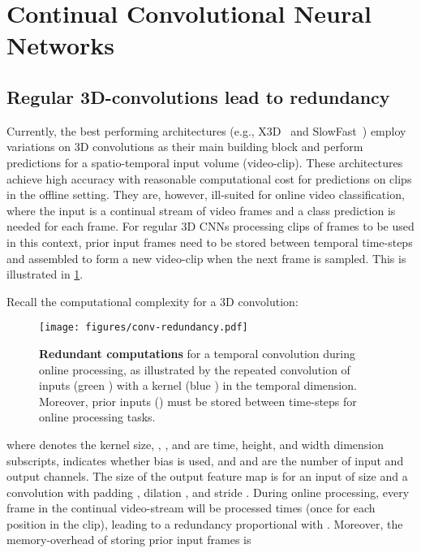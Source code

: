\documentclass[runningheads]{llncs}
\begin{document}
 \vspace{-2mm}
\section{Continual Convolutional Neural Networks}\label{sec:continual}
\vspace{-2mm}
\subsection{Regular 3D-convolutions lead to redundancy}\label{sec:regular-cnn-redundancy}
\vspace{-1mm}
Currently, the best performing architectures (e.g., X3D~\cite{feichtenhofer2020x3d} and SlowFast~\cite{feichtenhofer2019slowfast}) employ variations on 3D convolutions as their main building block and perform predictions for a spatio-temporal input volume (video-clip). 
These architectures achieve high accuracy with reasonable computational cost for predictions on clips in the offline setting.
They are, however, ill-suited for online video classification, 
where the input is a continual stream of video frames and a class prediction is needed for each frame. 
For regular 3D CNNs processing clips of  frames to be used in this context, prior  input frames need to be stored between temporal time-steps and assembled to form a new video-clip when the next frame is sampled.
This is illustrated in \cref{fig:conv-redundancy}.

Recall the computational complexity for a 3D convolution:

\begin{figure}
    \centering
    \texttt{[image: figures/conv-redundancy.pdf]}
	\caption{
	\textbf{Redundant computations} for a temporal convolution during online processing, as illustrated by the repeated convolution of inputs (green ) with a kernel (blue ) in the temporal dimension.
Moreover, prior inputs () must be stored between time-steps for online processing tasks. }
    \label{fig:conv-redundancy}
    \vspace{-5mm}
\end{figure}
where  denotes the kernel size, , , and  are time, height, and width dimension subscripts,  indicates whether bias is used, and  and  are the number of input and output channels. 
The size of the output feature map is  for an input of size  and a convolution with padding , dilation , and stride .
During online processing, every frame in the continual video-stream will be processed  times (once for each position in the clip), leading to a redundancy proportional with .
Moreover, the memory-overhead of storing prior input frames is 
\end{document}
